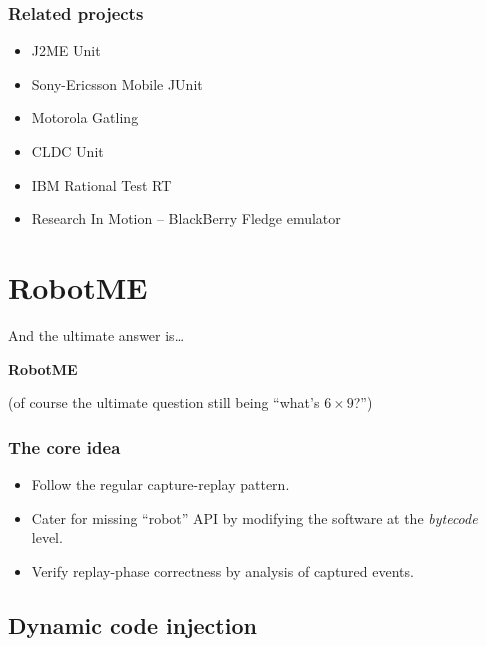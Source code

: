 \documentclass[compress]{beamer}
\begin{document}
\begin{frame}
    \frametitle{Related projects}

	\begin{itemize}
        \item J2ME Unit
        \item Sony-Ericsson Mobile JUnit
        \item Motorola Gatling
        \item CLDC Unit
        \item IBM Rational Test RT
        \item Research In Motion -- BlackBerry Fledge emulator
	\end{itemize}
\end{frame}



\section{RobotME} %

\begin{frame}
    And the ultimate answer is\ldots
    \vspace{2cm}
    \begin{center}\Huge\bfseries
    RobotME
    \end{center}
    \vspace{2cm}
    (of course the ultimate question still being ``what's $6\times 9$?'')
\end{frame}

\begin{frame}
    \frametitle{The core idea}

    \begin{itemize}
        \item Follow the regular capture-replay pattern.
        \item Cater for missing ``robot'' API by modifying the software at the \emph{bytecode} level.
        \item Verify replay-phase correctness by analysis of captured events.
    \end{itemize}
\end{frame}


\subsection[Injection]{Dynamic code injection} %
\end{document}
